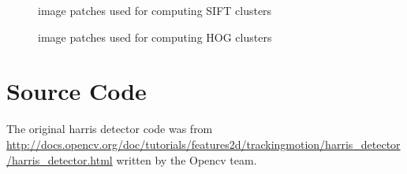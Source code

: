 \documentclass[a4paper,10pt]{article}
\begin{document}
\begin{figure}[h!]

\caption{image patches used for computing SIFT clusters}
\end{figure}

\begin{figure}[h!]

\caption{image patches used for computing HOG clusters}
\end{figure}


\section{Source Code}
The original harris detector code was from \url{http://docs.opencv.org/doc/tutorials/features2d/trackingmotion/harris_detector/harris_detector.html} written by the Opencv team.


\end{document}
